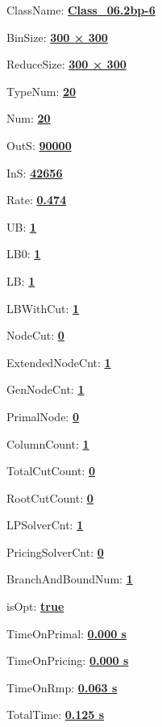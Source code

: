 \documentclass[11pt]{article}
\begin{document}
\pagestyle{empty}


ClassName: \underline{\textbf{Class_06.2bp-6}}
\par
BinSize: \underline{\textbf{300 × 300}}
\par
ReduceSize: \underline{\textbf{300 × 300}}
\par
TypeNum: \underline{\textbf{20}}
\par
Num: \underline{\textbf{20}}
\par
OutS: \underline{\textbf{90000}}
\par
InS: \underline{\textbf{42656}}
\par
Rate: \underline{\textbf{0.474}}
\par
UB: \underline{\textbf{1}}
\par
LB0: \underline{\textbf{1}}
\par
LB: \underline{\textbf{1}}
\par
LBWithCut: \underline{\textbf{1}}
\par
NodeCut: \underline{\textbf{0}}
\par
ExtendedNodeCnt: \underline{\textbf{1}}
\par
GenNodeCnt: \underline{\textbf{1}}
\par
PrimalNode: \underline{\textbf{0}}
\par
ColumnCount: \underline{\textbf{1}}
\par
TotalCutCount: \underline{\textbf{0}}
\par
RootCutCount: \underline{\textbf{0}}
\par
LPSolverCnt: \underline{\textbf{1}}
\par
PricingSolverCnt: \underline{\textbf{0}}
\par
BranchAndBoundNum: \underline{\textbf{1}}
\par
isOpt: \underline{\textbf{true}}
\par
TimeOnPrimal: \underline{\textbf{0.000 s}}
\par
TimeOnPricing: \underline{\textbf{0.000 s}}
\par
TimeOnRmp: \underline{\textbf{0.063 s}}
\par
TotalTime: \underline{\textbf{0.125 s}}
\par
\newpage
\end{document}
